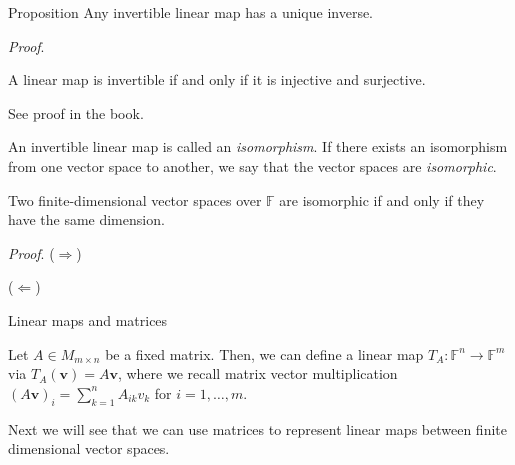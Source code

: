 \documentclass [aspectratio=169]{beamer}
\newcommand{\bv}{{\mathbf{v}}}
\newcommand{\F}{{\mathbb{F}}}
\begin{document}
\begin{frame}
\begin{exampleblock}{Proposition}
Any invertible linear map has a unique inverse.
\end{exampleblock}
\textit{Proof}.
\vspace{3.5cm}

\end{frame}

\begin{frame}

\begin{theorem}
A linear map is invertible if and only if it is injective and surjective.
\end{theorem}

See proof in the book.

\vspace{2em}

\begin{definition}
An invertible linear map is called an \emph{isomorphism}. If there exists an isomorphism from one vector space to another, we say that the vector spaces are \emph{isomorphic}.
\end{definition}
\end{frame}

\begin{frame}
\begin{theorem}
Two finite-dimensional vector spaces over $\F$ are isomorphic if and only if they have the same dimension.
\end{theorem}
\textit{Proof}.
($\Rightarrow$) 

\vspace{4cm}
\end{frame}

\begin{frame}
($\Leftarrow$) 
\vspace{6cm}
\end{frame}



\begin{frame}{Linear maps and matrices}
\begin{example}
Let $A\in M_{m\times n}$ be a fixed matrix. Then, we can define a linear map $T_A \colon \F^n \to \F^m$ via $T_A(\bv) = A \bv$, where we recall matrix vector multiplication $(A\bv)_i = \sum_{k=1}^n A_{ik}v_k$ for $i=1, \ldots, m$.
\end{example}

Next we will see that we can use matrices to represent linear maps between finite dimensional vector spaces. 

\end{frame}
\end{document}
